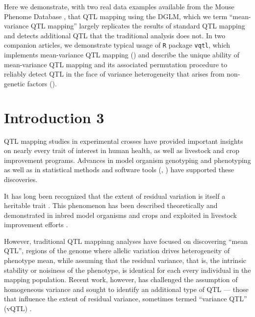     Here we demonstrate, with two real data examples available from the Mouse Phenome Database \citep{Bogue2015}, that QTL mapping using the DGLM, which we term ``mean-variance QTL mapping'' largely replicates the results of standard QTL mapping and detects additional QTL that the traditional analysis does not.
    In two companion articles, we demonstrate typical usage of \texttt{R} package \texttt{vqtl}, which implements mean-variance QTL mapping  (\CortyRPaper) and 
    describe the unique ability of mean-variance QTL mapping and its associated permutation procedure to reliably detect QTL in the face of variance heterogeneity that arises from non-genetic factors (\CortyMethodsPaper).


\section{Introduction 3}

QTL mapping studies in experimental crosses have provided important insights on nearly every trait of interest in human health, as well as livestock and crop improvement programs.
Advances in model organism genotyping \citep{Williams1990} and phenotyping \citep{Yang2014a} as well as in statistical methods \citep{Lander1989a,Martinez1992} and software tools (\eg, \citealt{Broman2003,Mulligan2017}) have supported these discoveries.

It has long been recognized that the extent of residual variation is itself a heritable trait \citep{Falconer1965,Lynch1998}.
This phenomenon has been described theoretically \citep{Hill2004-uo,Hill2010} and demonstrated in inbred model organisms \citep{Sorensen2015,Ayroles2015} and crops \citep{Yang2012-aw,Forsberg2015} and exploited in livestock improvement efforts \citep{Mulder2008,Ibanez-Escriche2008-ie}.

However, traditional QTL mappinng analyses have focused on discovering ``mean QTL'', regions of the genome where allelic variation drives heterogeneity of phenotype mean, while assuming that the residual variance, that is, the intrinsic stability or noisiness of the phenotype, is identical for each every individual in the mapping population.
Recent work, however, has challenged the assumption of homogeneous variance and sought to identify an additional type of QTL --- those that
influence the extent of residual variance, sometimes termed ``variance QTL'' (vQTL) \citep{Pare2010,Ronnegard2011a,Ronnegard2012,Cao2014}.


